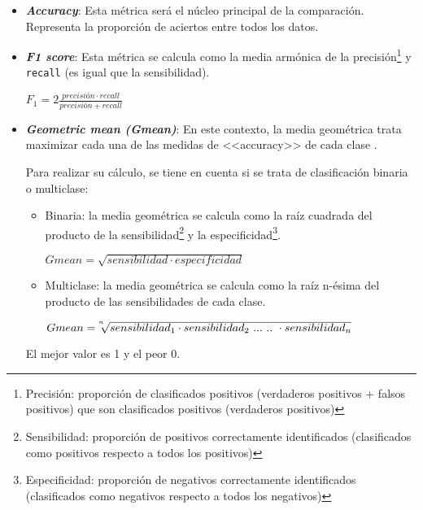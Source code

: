 \begin{itemize}
    \item \textit{\textbf{Accuracy}}: Esta métrica será el núcleo principal de
    la comparación. Representa la proporción de aciertos entre todos los datos.

    \item \textit{\textbf{F1 score}}: Esta métrica se calcula como la media
    armónica de la precisión\footnote{Precisión: proporción de clasificados
    positivos (verdaderos positivos + falsos positivos) que son clasificados
    positivos (verdaderos positivos)} y \texttt{recall} (es igual que la
    sensibilidad).

    \begin{center}
        $ F_1 = 2\frac{precisión \cdot recall}{precisión + recall} $
    \end{center}

    \item \textit{\textbf{Geometric mean (Gmean)}}: En este contexto, la media
    geométrica trata maximizar cada una de las medidas de <<accuracy>> de cada
    clase \cite{imbalanced_learn}.

    Para realizar su cálculo, se tiene en cuenta si se trata de clasificación
    binaria o multiclase:
    \begin{itemize}
        \item Binaria: la media geométrica se calcula como la raíz cuadrada del
        producto de la sensibilidad\footnote{Sensibilidad: proporción de
        positivos correctamente identificados (clasificados como positivos
        respecto a todos los positivos)\cite{eswiki:145396343}} y la
        especificidad\footnote{Especificidad: proporción de negativos
        correctamente identificados (clasificados como negativos respecto a
        todos los negativos)\cite{eswiki:145396343}}.

        \begin{center}
            $ Gmean = \sqrt{sensibilidad \cdot especificidad} $
        \end{center}
        

        \item Multiclase: la media geométrica se calcula como la raíz n-ésima
        del producto de las sensibilidades de cada clase.

        \begin{center}
            $Gmean = \sqrt[\leftroot{5} \uproot{5} n]{sensibilidad_1 \cdot
            sensibilidad_2 ~...~..~\cdot sensibilidad_n }$
        \end{center}
    \end{itemize}

    El mejor valor es 1 y el peor 0.
\end{itemize}

